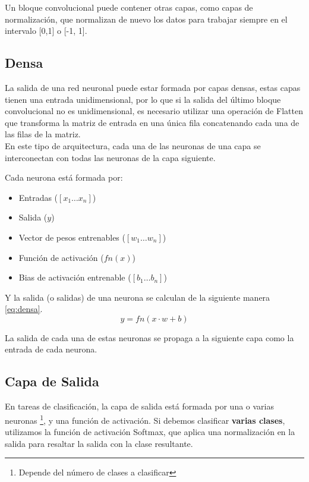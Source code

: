 Un bloque convolucional puede contener otras capas, como capas de
normalización, que normalizan de nuevo los datos para trabajar siempre
en el intervalo {[}0,1{]} o [-1, 1].

\hypertarget{densa}{%
\subsection{Densa}\label{densa}}

La salida de una red neuronal puede estar formada por capas densas, estas capas
tienen una entrada unidimensional, por lo que si la salida del último
bloque convolucional no es unidimensional, es necesario utilizar una
operación de Flatten que transforma la matriz de entrada en una única
fila concatenando cada una de las filas de la matriz.\\
En este tipo de arquitectura, cada una de las neuronas de una capa se interconectan con todas las neuronas de la capa siguiente. 

Cada neurona está formada por:

\begin{itemize}
\item
  Entradas ($[x_1 \dots x_n]$)
\item
  Salida  ($y$)
\item
  Vector de pesos entrenables ($[w_1 \dots w_n]$)
\item
  Función de activación ($fn(x)$)
\item
  Bias de activación entrenable ($[b_1 \dots b_n]$)
\end{itemize}

Y la salida (o salidas) de una neurona se calculan de la siguiente manera \eqref{eq:densa}.
\begin{equation}
    \label{eq:densa}
    y = fn(x \cdot w + b)
\end{equation}

La salida de cada una de estas neuronas se propaga a la siguiente capa como la entrada de cada neurona.

\hypertarget{capa-de-salida}{%
\subsection{Capa de Salida}\label{capa-de-salida}}

En tareas de clasificación, la capa de salida está formada por una o
varias neuronas \footnote{Depende del número de clases a clasificar}, y una función de
activación. Si debemos clasificar \textbf{varias clases}, utilizamos la
función de activación Softmax, que aplica una normalización en la salida
para resaltar la salida con la clase resultante.

